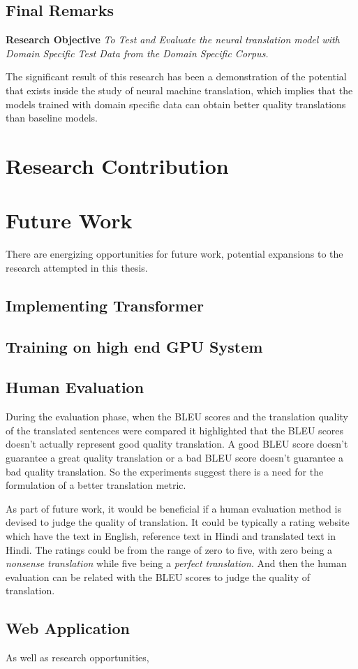 \subsection{Final Remarks }
\textbf{Research Objective} \textit{To Test and Evaluate the neural translation model with Domain Specific Test Data from the Domain Specific Corpus.}

The significant result of this research has been a demonstration of the potential that exists inside the study of neural machine translation, which implies that the models trained with domain specific data can obtain better quality translations than baseline models.

\section{Research Contribution}
\section{Future Work}
There are energizing opportunities for future work, potential expansions to the research attempted in this thesis.
\subsection{Implementing Transformer}
\subsection{Training on high end GPU System}
\subsection{Human Evaluation}

During the evaluation phase, when the BLEU scores and the translation quality of the translated sentences were compared it highlighted that the BLEU scores doesn't actually represent good quality translation. A good BLEU score doesn't guarantee a great quality translation or a bad BLEU score doesn't guarantee a bad quality translation. So the experiments suggest there is a need for the formulation of a better translation metric.

As part of future work, it would be beneficial if a human evaluation method is devised to judge the quality of translation. It could be typically a rating website which have the text in English, reference text in Hindi and translated text in Hindi. The ratings could be from the range of zero to five, with zero being a \textit{nonsense translation} while five being a \textit{perfect translation}. And then the human evaluation can be related with the BLEU scores to judge the quality of translation.  

\subsection{Web Application}
As well as research opportunities, 